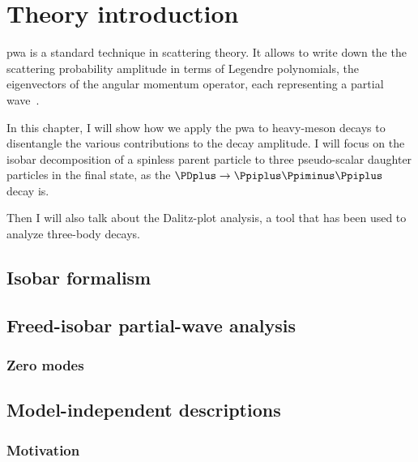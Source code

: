 \chapter{Theory introduction}

    \Ac{pwa} is a standard technique in scattering theory.
    It allows to write down the the scattering probability amplitude in terms of Legendre polynomials, the eigenvectors of the angular momentum operator, each representing a partial wave~\cite[\S~11.2]{griffiths_intro_qm}.


    In this chapter, I will show how we apply the \ac{pwa} to heavy-meson decays to disentangle the various contributions to the decay amplitude.
    I will focus on the isobar decomposition of a spinless parent particle to three pseudo-scalar daughter particles in the final state, as the $\PDplus\to\Ppiplus\Ppiminus\Ppiplus$ decay is.


    Then I will also talk about the Dalitz-plot analysis, a tool that has been used to analyze three-body decays.

    
    


    \section{Isobar formalism}
    

    \section{Freed-isobar partial-wave analysis}
    

        \subsection{Zero modes}
        

    \section{Model-independent descriptions}

    \subsection{Motivation}

